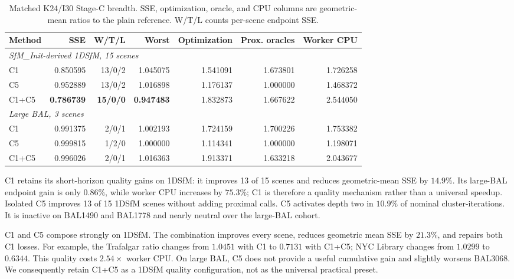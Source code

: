 \begin{table}[t]
  \centering
  \caption{Matched K24/I30 Stage-C breadth.  SSE, optimization, oracle, and CPU
  columns are geometric-mean ratios to the plain reference.  W/T/L counts
  per-scene endpoint SSE.}
  \label{tab:stage-c-breadth}
  \small
  \begin{tabular}{lrrrrrr}
    \hline
    Method & SSE & W/T/L & Worst & Optimization & Prox. oracles & Worker CPU \\
    \hline
    \multicolumn{7}{l}{\emph{SfM\_Init-derived 1DSfM, 15 scenes}} \\
    C1 & 0.850595 & 13/0/2 & 1.045075 & 1.541091 & 1.673801 & 1.726258 \\
    C5 & 0.952889 & 13/0/2 & 1.016898 & 1.176137 & 1.000000 & 1.468372 \\
    C1+C5 & \textbf{0.786739} & \textbf{15/0/0} & \textbf{0.947483}
      & 1.832873 & 1.667622 & 2.544050 \\
    \hline
    \multicolumn{7}{l}{\emph{Large BAL, 3 scenes}} \\
    C1 & 0.991375 & 2/0/1 & 1.002193 & 1.724159 & 1.700226 & 1.753382 \\
    C5 & 0.999815 & 1/2/0 & 1.000000 & 1.114341 & 1.000000 & 1.198071 \\
    C1+C5 & 0.996026 & 2/0/1 & 1.016363 & 1.913371 & 1.633218 & 2.043677 \\
    \hline
  \end{tabular}
\end{table}

C1 retains its short-horizon quality gains on 1DSfM: it improves 13 of 15
scenes and reduces geometric-mean SSE by $14.9\%$.  Its large-BAL endpoint gain
is only $0.86\%$, while worker CPU increases by $75.3\%$; C1 is therefore a
quality mechanism rather than a universal speedup.  Isolated C5 improves 13 of
15 1DSfM scenes without adding proximal calls.  C5 activates depth two in
$10.9\%$ of nominal cluster-iterations.  It is inactive on BAL1490 and BAL1778
and nearly neutral over the large-BAL cohort.

C1 and C5 compose strongly on 1DSfM.  The combination improves every scene,
reduces geometric mean SSE by $21.3\%$, and repairs both C1 losses.  For
example, the Trafalgar ratio changes from $1.0451$ with C1 to $0.7131$ with
C1+C5; NYC Library changes from $1.0299$ to $0.6344$.  This quality costs
$2.54\times$ worker CPU.  On large BAL, C5 does not provide a useful cumulative
gain and slightly worsens BAL3068.  We consequently retain C1+C5 as a 1DSfM
quality configuration, not as the universal practical preset.

